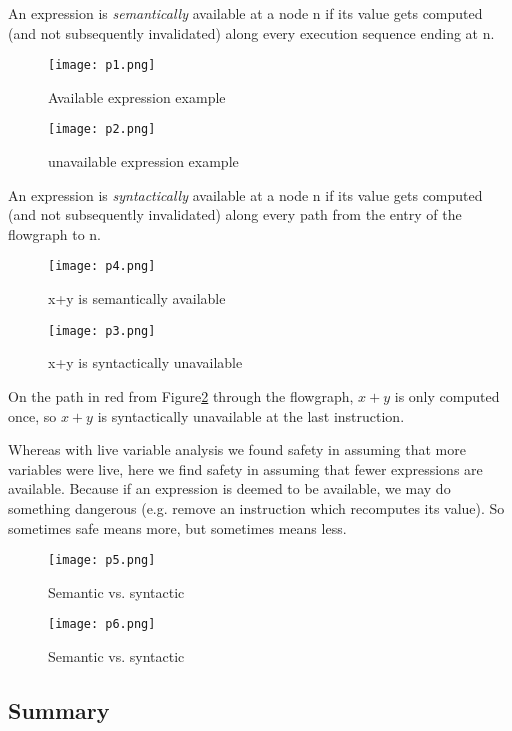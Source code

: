 An expression is \textit{semantically} available at a node n if its value gets computed
(and not subsequently invalidated) along every execution sequence ending at n.

\begin{figure}[!htb]
	\texttt{[image: p1.png]}
	\caption{Available expression example}\label{fig:p1}
	\endminipage\hfill
	\texttt{[image: p2.png]}
	\caption{unavailable expression example}\label{fig:p2}
	\endminipage
\end{figure}


An expression is \textit{syntactically} available at a node n if its value gets computed
(and not subsequently invalidated) along every path from the entry of the flowgraph to n.


\begin{figure}[!htb]
	\texttt{[image: p4.png]}
	\caption{x+y is semantically available}\label{fig:p4}
	\endminipage\hfill
	\texttt{[image: p3.png]}
	\caption{x+y is syntactically unavailable}\label{fig:p3}
	\endminipage
\end{figure}


On the path in red from Figure\ref{fig:p3} through the flowgraph, \(x+y\) is only
computed once, so \(x+y\) is syntactically unavailable at the last instruction.


Whereas with live variable analysis we found safety in assuming that
more variables were live, here we find safety in assuming that fewer
expressions are available. Because if an expression is deemed to be available, we
may do something dangerous (e.g. remove an instruction which recomputes its value).
So sometimes safe means more, but sometimes means less.

\begin{figure}[H]
	\texttt{[image: p5.png]}
	\caption{Semantic vs. syntactic}\label{fig:p5}
	\endminipage\hfill
	\texttt{[image: p6.png]}
	\caption{Semantic vs. syntactic}\label{fig:p6}
	\endminipage
\end{figure}


\subsection{Summary}


